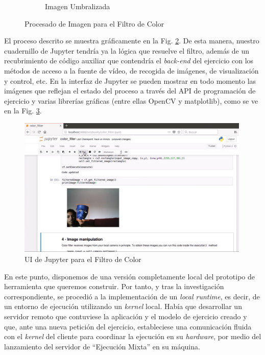 \begin{figure}
\begin{subfigure}{.32\textwidth}
  \caption{Imagen Umbralizada}
  \label{mask}
\end{subfigure}
\caption{Procesado de Imagen para el Filtro de Color}
\label{procesado}
\end{figure}

El proceso descrito se muestra gráficamente en la Fig. \ref{procesado}. De esta manera, nuestro cuadernillo de Jupyter tendría ya la lógica que resuelve el filtro, además de un recubrimiento de código auxiliar que contendría el \textit{back-end} del ejercicio con los métodos de acceso a la fuente de vídeo, de recogida de imágenes, de visualización y control, etc. En la interfaz de Jupyter se pueden mostrar en todo momento las imágenes que reflejan el estado del proceso a través del API de programación de ejercicio y varias librerías gráficas (entre ellas OpenCV y matplotlib), como se ve en la Fig. \ref{ui_cf_jupyter}.

\begin{figure}[!hbtp]  \centering\noindent
    \includegraphics[width=0.99\textwidth]{figures/ui_cf_jupyter.jpg}
    \caption{UI de Jupyter para el Filtro de Color}
    \label{ui_cf_jupyter}
\end{figure}

En este punto, disponemos de una versión completamente local del prototipo de herramienta que queremos construir. Por tanto, y tras la investigación correspondiente, se procedió a la implementación de un \textit{local runtime}, es decir, de un entorno de ejecución utilizando un \textit{kernel} local. Había que desarrollar un servidor remoto que contuviese la aplicación y el modelo de ejercicio creado y que, ante una nueva petición del ejercicio, estableciese una comunicación fluida con el \textit{kernel} del cliente para coordinar la ejecución en su \textit{hardware}, por medio del lanzamiento del servidor de ``Ejecución Mixta'' en su máquina. 

